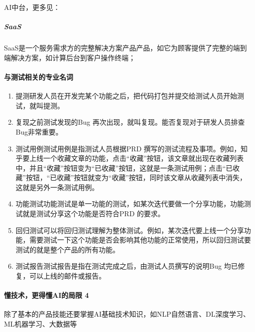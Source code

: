 \documentclass[letterpaper,11pt,english]{sphinxmanual}
\begin{document}
AI中台，更多见：


\subparagraph{SaaS}
\label{\detokenize{chapter_idea/understand_tech:saas}}
SaaS是一个服务需求方的完整解决方案产品产品，如它为顾客提供了完整的端到端解决方案，如计算后台到客户操作终端；%
\begin{footnote}[133]\sphinxAtStartFootnote
{}
%
\end{footnote}


\paragraph{与测试相关的专业名词}
\label{\detokenize{chapter_idea/understand_tech:id22}}\begin{enumerate}
%
\item {} 
提测研发人员在开发完某个功能之后，把代码打包并提交给测试人员开始测试，就叫提测。

\item {} 
复现之前测试发现的Bug
再次出现，就叫复现。能否复现对于研发人员排查Bug非常重要。

\item {} 
测试用例测试用例是指测试人员根据PRD
撰写的测试流程及事项。例如，知乎要上线一个收藏文章的功能，点击“收藏”按钮，该文章就出现在收藏列表中，并且“收藏”按钮变为“已收藏”按钮，这就是一条测试用例；点击“已收藏”按钮，“已收藏”按钮就变为“收藏”按钮，同时该文章从收藏列表中消失，这就是另外一条测试用例。

\item {} 
功能测试功能测试是单一功能的测试，如某次迭代要做一个分享功能，功能测试就是测试分享这个功能是否符合PRD
的要求。

\item {} 
回归测试可以将回归测试理解为整体测试。例如，某次迭代要上线一个分享功能，需要测试一下这个功能是否会影响其他功能的正常使用，所以回归测试要测试的就是整个产品的所有功能。

\item {} 
测试报告测试报告是指在测试完成之后，由测试人员撰写的说明Bug
均已修复，可以上线的邮件或报告。

\end{enumerate}


\paragraph{懂技术，更得懂AI的局限 4\sphinxfootnotemark[134]}
\label{\detokenize{chapter_idea/understand_tech:ai-4}}%
\begin{footnotetext}[134]\sphinxAtStartFootnote
{}
%
\end{footnotetext}\ignorespaces 
除了基本的产品技能还要掌握AI基础技术知识，如NLP自然语言、DL深度学习、ML机器学习、大数据等
\end{document}
